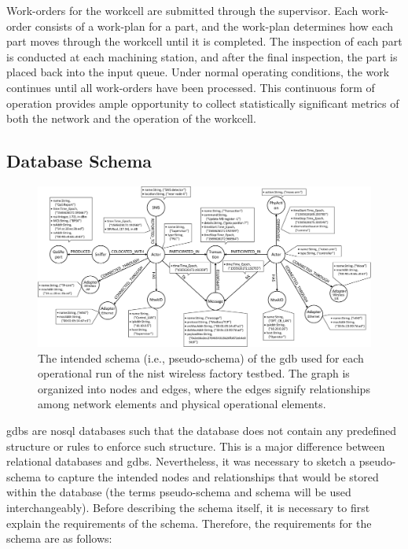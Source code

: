 Work-orders for the workcell are submitted through the supervisor. Each work-order consists of a work-plan for a part, and the work-plan determines how each part moves through the workcell until it is completed. The inspection of each part is conducted at each machining station, and after the final inspection, the part is placed back into the input queue.  Under normal operating conditions, the work continues until all work-orders have been processed.  This continuous form of operation provides ample opportunity to collect statistically significant metrics of both the network and the operation of the workcell.

\subsection{Database Schema}\label{gdbappl:sec::dbschema}

\begin{figure}[!ht]
	\centering
	\includegraphics[width=\textwidth]{./chapter-gdb-appl/figures/database/graph_schema_0816.eps}
	\caption{The intended schema (i.e., pseudo-schema) of the \gls{gdb} used for each operational run of the \gls{nist} wireless factory testbed.  The graph is organized into nodes and edges, where the edges signify relationships among network elements and physical operational elements.}
	\label{gdbappl:fig::database:schema}
\end{figure}

\Glspl{gdb} are \gls{nosql} databases such that the database does not contain any predefined structure or rules to enforce such structure.  This is a major difference between relational databases and \glspl{gdb}.  Nevertheless, it was necessary to sketch a pseudo-schema to capture the intended nodes and relationships that would be stored within the database (the terms pseudo-schema and schema will be used interchangeably). Before describing the schema itself, it is necessary to first explain the requirements of the schema.  Therefore, the requirements for the schema are as follows:

